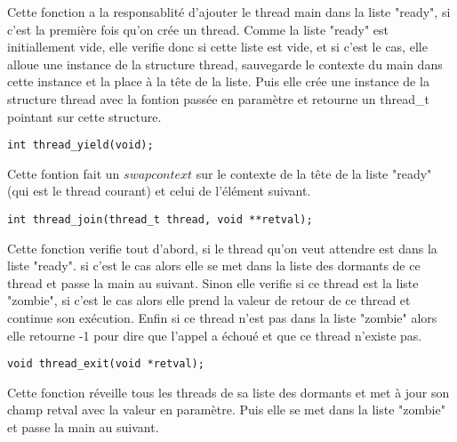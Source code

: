 \documentclass{article}
\begin{document}
Cette fonction a la responsablité d'ajouter le thread main dans la liste "ready", 
si c'est la première fois qu'on crée un thread. 
Comme la liste "ready" est initiallement vide,  elle verifie donc si cette liste est vide, et si c'est le cas, 
elle alloue une instance de la structure thread, 
sauvegarde le contexte du main dans cette instance et la place à la tête de la liste.
Puis elle crée une instance de la structure thread avec la fontion
passée en paramètre et retourne un thread_t pointant sur cette structure.
~~\\
\begin{verbatim}
int thread_yield(void);
\end{verbatim}
Cette fontion fait un $swapcontext$ sur le contexte de la tête de 
la liste "ready" (qui est le thread courant) et celui de l'élément suivant.
~~\\
\begin{verbatim}
int thread_join(thread_t thread, void **retval);
\end{verbatim}
Cette fonction verifie tout d'abord, si le thread qu'on veut 
attendre est dans la liste "ready". si c'est le cas 
alors elle se met dans la liste des dormants de ce thread et passe la main au suivant.
Sinon elle verifie si ce thread est la liste "zombie", 
si c'est le cas alors elle prend la valeur de retour de ce thread et continue son exécution.
Enfin si ce thread n'est pas dans la liste "zombie" 
alors elle retourne -1 pour dire que l'appel a échoué et que ce thread n'existe pas.
~~\\   
\begin{verbatim}
void thread_exit(void *retval);
\end{verbatim}
Cette fonction réveille tous les threads de sa liste des dormants et
 met à jour son champ retval avec la valeur en paramètre. Puis elle se met dans la liste "zombie" et passe la main au suivant.
\end{document}
